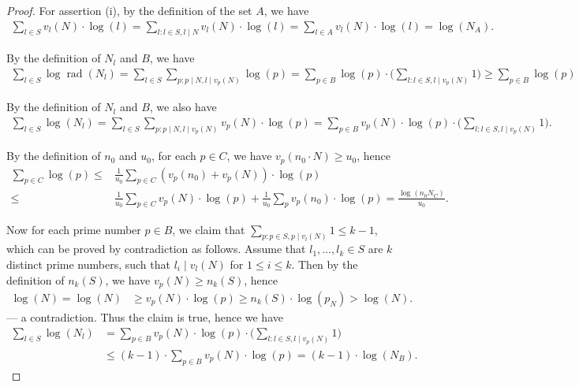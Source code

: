 \documentclass[a4paper, 12pt]{article}
\DeclareMathOperator{\rad}{\text{rad}}
\numberwithin{equation}{section}
\theoremstyle{definition}
\begin{document}
\begin{proof}
For assertion (i), by the definition of the set $A$, we have 
\small\begin{align*}
    \sum_{l\in S}v_l(N)\cdot\log(l) = \sum_{l:l\in S,l\mid N}v_l(N)\cdot\log(l) = \sum_{l\in A}v_l(N)\cdot\log(l) = \log(N_A).
\end{align*}\normalsize


By the definition of $N_l$ and $B$, we have 
\small\begin{align*}
\sum_{l\in S} \log\rad(N_l)
= \sum_{l \in S} \sum_{p: p\mid N, l\mid v_p(N)} \log(p)
= \sum_{p\in B}\log(p)\cdot\big(\sum_{l:l \in S,l\mid v_p(N)} 1 \big)
\ge \sum_{p\in B} \log(p) 
\end{align*}\normalsize


By the definition of $N_l$ and $B$, we also have 
\small\begin{align*}
\sum_{l\in S} \log(N_l)
= \sum_{l \in S} \sum_{p:p\mid N,l\mid v_p(N)} v_p(N)\cdot \log(p)
= \sum_{p\in B}v_p(N)\cdot \log(p)\cdot\big(\sum_{l:l \in S,l\mid v_p(N)} 1 \big).
\end{align*}\normalsize


By the definition of $n_0$ and $u_0$, for each $p\in C$, we have $v_p(n_0 \cdot N) \ge u_0$, hence 
\small\begin{align*}
\sum_{p\in C} \log(p) \le&  \frac{1}{u_0} \sum_{p\in C} (v_p(n_0) + v_p(N) ) \cdot \log(p) 
\\ \le&  \frac{1}{u_0} \sum_{p\in C} v_p(N)\cdot \log(p) 
+ \frac{1}{u_0} \sum_{p} v_p(n_0) \cdot \log(p)   
= \frac{\log(n_0 N_C)}{u_0}.
\end{align*}\normalsize


Now for each prime number $p\in B$, we claim that $\sum_{p:p\in S, p\mid v_l(N)} 1 \le k-1$, which can be proved by contradiction as follows.
Assume that $l_1,\dots, l_k\in S$ are $k$ distinct prime numbers, such that $l_i\mid v_l(N)$ for $1\le i\le k$. Then by the definition of $n_k(S)$, we have $v_p(N) \ge n_k(S)$, hence
\begin{align*}
    \log(N) = \log(N) &\ge v_p(N)\cdot \log(p)\ge n_k(S) \cdot \log(p_N)  > \log(N).
\end{align*}
--- a contradiction. Thus the claim is true, hence we have 
\small\begin{align*}
    \sum_{l\in S} \log(N_l)
    &= \sum_{p\in B} v_p(N)\cdot \log(p)\cdot\big(\sum_{l: l \in S, l\mid v_p(N)} 1 \big)
   \\&\le (k-1)\cdot\sum_{p\in B}v_p(N)\cdot \log(p) = (k-1)\cdot\log(N_B).
\end{align*}\normalsize


\end{proof}
\end{document}

